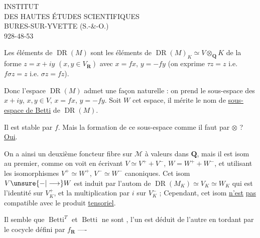INSTITUT\\
DES HAUTES ÉTUDES SCIENTIFIQUES\\
BURES-SUR-YVETTE (S.-\&-O.)\\
928-48-53

Les éléments de $\operatorname{DR}(M)$ sont les éléments de $\operatorname{DR}(M)_K\simeq V\otimes_{\mathbf Q}K$ de la forme $z=x+iy$ $(x,y\in V_{\mathbf R})$ avec $x=fx$, $y=-fy$ (on exprime $\tau z=z$ i.e. $f\sigma z=z$ i.e. $\sigma z=fz$).

 Donc l'espace $\operatorname{DR}(M)$ admet une  façon naturelle  : on prend le sous-espace des $x+iy$, $x,y\in V$, $x=fx$, $y=-fy$. Soit $W$ cet espace, il mérite le nom de \uline{sous-espace de Betti}  de $\operatorname{DR}(M)$.

Il est stable par $f$. Mais la formation de ce sous-espace  comme il faut par $\otimes$ ? \uline{Oui}.


On a ainsi un deuxième foncteur fibre sur $\mathcal M$ à valeurs dans $\mathbf Q$, mais il est isom  au premier,  comme on voit en écrivant $V\simeq V^++V^-$, $W=W^++W^-$, et utilisant les isomorphismes $V^+\simeq W^+$, $V^-\simeq W^-$ canoniques. Cet isom $V\unsure{-|\longrightarrow}W$ est  induit par l'autom de $\operatorname{DR}(M_K)\simeq V_K\simeq W_K$ qui est l'identité sur $V_K^+$, et la multiplication par $i$ sur $V_K^-$ ; Cependant, cet isom \uline{n'est} \uline{pas} compatible avec le produit \uline{tensoriel}.

Il semble que $\operatorname{Betti}^T$ et $\operatorname{Betti}$ ne sont , l'un est déduit de l'autre en tordant par le cocycle défini par $f_{\mathbf R}$ ----
